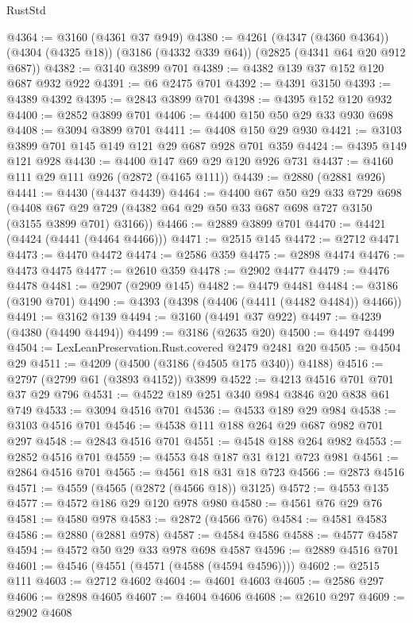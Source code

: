 \begin{lexlean}{RustStd}
\begin{coremodule}
{\begin{coremodule}
{{{{{{{{{{{{{{{{{{{{@4364 := @3160 (@4361 @37 @949)
@4380 := @4261
    (@4347 (@4360 @4364))
    (@4304 (@4325 @18))
    (@3186 (@4332 @339 @64))
    (@2825 (@4341 @64 @20 @912 @687))
@4382 := @3140 @3899 @701
@4389 := @4382 @139 @37 @152 @120 @687 @932 @922
@4391 := @6 @2475 @701
@4392 := @4391 @3150
@4393 := @4389 @4392
@4395 := @2843 @3899 @701
@4398 := @4395 @152 @120 @932
@4400 := @2852 @3899 @701
@4406 := @4400 @150 @50 @29 @33 @930 @698
@4408 := @3094 @3899 @701
@4411 := @4408 @150 @29 @930
@4421 := @3103 @3899 @701 @145 @149 @121 @29 @687 @928 @701 @359
@4424 := @4395 @149 @121 @928
@4430 := @4400 @147 @69 @29 @120 @926 @731
@4437 := @4160 @111 @29 @111 @926 (@2872 (@4165 @111))
@4439 := @2880 (@2881 @926)
@4441 := @4430 (@4437 @4439)
@4464 := @4400
    @67
    @50
    @29
    @33
    @729
    @698
    (@4408 @67 @29 @729 (@4382 @64 @29 @50 @33 @687 @698 @727 @3150 (@3155 @3899 @701) @3166))
@4466 := @2889 @3899 @701
@4470 := @4421 (@4424 (@4441 (@4464 @4466)))
@4471 := @2515 @145
@4472 := @2712 @4471
@4473 := @4470 @4472
@4474 := @2586 @359
@4475 := @2898 @4474
@4476 := @4473 @4475
@4477 := @2610 @359
@4478 := @2902 @4477
@4479 := @4476 @4478
@4481 := @2907 (@2909 @145)
@4482 := @4479 @4481
@4484 := @3186 (@3190 @701)
@4490 := @4393 (@4398 (@4406 (@4411 (@4482 @4484)) @4466))
@4491 := @3162 @139
@4494 := @3160 (@4491 @37 @922)
@4497 := @4239 (@4380 (@4490 @4494))
@4499 := @3186 (@2635 @20)
@4500 := @4497 @4499
@4504 := LexLeanPreservation.Rust.covered @2479 @2481 @20
@4505 := @4504 @29
@4511 := @4209 (@4500 (@3186 (@4505 @175 @340)) @4188)
@4516 := @2797 (@2799 @61 (@3893 @4152)) @3899
@4522 := @4213 @4516 @701 @701 @37 @29 @796
@4531 := @4522 @189 @251 @340 @984 @3846 @20 @838 @61 @749
@4533 := @3094 @4516 @701
@4536 := @4533 @189 @29 @984
@4538 := @3103 @4516 @701
@4546 := @4538 @111 @188 @264 @29 @687 @982 @701 @297
@4548 := @2843 @4516 @701
@4551 := @4548 @188 @264 @982
@4553 := @2852 @4516 @701
@4559 := @4553 @48 @187 @31 @121 @723 @981
@4561 := @2864 @4516 @701
@4565 := @4561 @18 @31 @18 @723
@4566 := @2873 @4516
@4571 := @4559 (@4565 (@2872 (@4566 @18)) @3125)
@4572 := @4553 @135
@4577 := @4572 @186 @29 @120 @978 @980
@4580 := @4561 @76 @29 @76
@4581 := @4580 @978
@4583 := @2872 (@4566 @76)
@4584 := @4581 @4583
@4586 := @2880 (@2881 @978)
@4587 := @4584 @4586
@4588 := @4577 @4587
@4594 := @4572 @50 @29 @33 @978 @698 @4587
@4596 := @2889 @4516 @701
@4601 := @4546 (@4551 (@4571 (@4588 (@4594 @4596))))
@4602 := @2515 @111
@4603 := @2712 @4602
@4604 := @4601 @4603
@4605 := @2586 @297
@4606 := @2898 @4605
@4607 := @4604 @4606
@4608 := @2610 @297
@4609 := @2902 @4608
}}}}}}}}}}}}}}}}}}}}
\end{coremodule}}
\end{coremodule}
\end{lexlean}
